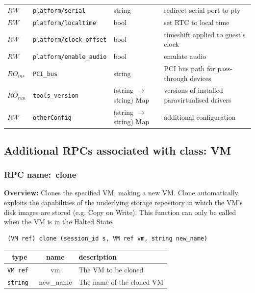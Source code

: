 \begin{longtable}{|lllp{}|}
$\mathit{RW}$ &  {\tt platform/serial} & string & redirect serial port to pty \\
$\mathit{RW}$ &  {\tt platform/localtime} & bool & set RTC to local time \\
$\mathit{RW}$ &  {\tt platform/clock\_offset} & bool & timeshift applied to guest's clock \\
$\mathit{RW}$ &  {\tt platform/enable\_audio} & bool & emulate audio \\
$\mathit{RO}_\mathit{ins}$ &  {\tt PCI\_bus} & string & PCI bus path for pass-through devices \\
$\mathit{RO}_\mathit{run}$ &  {\tt tools\_version} & (string $\rightarrow$ string) Map & versions of installed paravirtualised drivers \\
$\mathit{RW}$ &  {\tt otherConfig} & (string $\rightarrow$ string) Map & additional configuration \\
\hline
\end{longtable}
\subsection{Additional RPCs associated with class: VM}
\subsubsection{RPC name:~clone}

{\bf Overview:} 
Clones the specified VM, making a new VM. Clone automatically exploits the capabilities of the underlying storage repository in which the VM's disk images are stored (e.g. Copy on Write).   This function can only be called when the VM is in the Halted State.

\begin{verbatim} (VM ref) clone (session_id s, VM ref vm, string new_name)\end{verbatim}



 
\vspace{0.3cm}
\begin{tabular}{|c|c|p{7cm}|}
 \hline
{\bf type} & {\bf name} & {\bf description} \\ \hline
{\tt VM ref } & vm & The VM to be cloned \\ \hline 

{\tt string } & new\_name & The name of the cloned VM \\ \hline 

\end{tabular}

